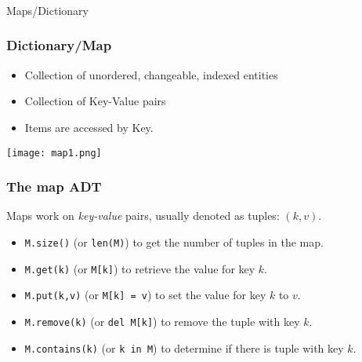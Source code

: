 \begin{frame}[fragile]\frametitle{}
\begin{center}
{\Large Maps/Dictionary}
\end{center}

\end{frame}

\begin{frame}
	\frametitle{Dictionary/Map}
	
		
			\begin{itemize}
				\item Collection of unordered, changeable, indexed entities
				\item Collection of Key-Value pairs
				\item Items are accessed by Key.
			\end{itemize}

\begin{center}
\texttt{[image: map1.png]}
\end{center}


\end{frame}


\begin{frame}
	\frametitle{The map ADT}
	
Maps work on \textit{key-value} pairs, usually denoted as tuples: $(k,v)$.
			
			\begin{itemize}
				\item \texttt{M.size()} (or \texttt{len(M)}) to get the number of tuples in the map.
					
				\item \texttt{M.get(k)} (or \texttt{M[k]}) to retrieve the value for key $k$.
				\item \texttt{M.put(k,v)} (or \texttt{M[k] = v}) to set the value for key $k$ to $v$.
					
				\item \texttt{M.remove(k)} (or \texttt{del M[k]}) to remove the tuple with key $k$.
					
				\item \texttt{M.contains(k)} (or \texttt{k in M}) to determine if there is tuple with key $k$.
			\end{itemize}

\end{frame}

